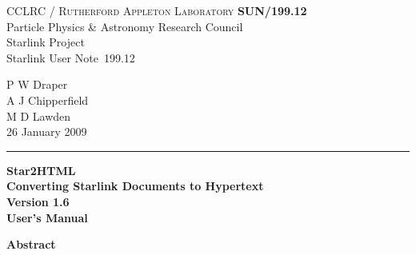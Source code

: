 \documentclass[twoside,11pt]{article}
\newcommand{\stardoccategory}  {Starlink User Note}
\newcommand{\stardocinitials}  {SUN}
\newcommand{\stardocnumber}    {199.12}
\newcommand{\stardocauthors}   {P W Draper\\
                                A J Chipperfield\\
                                M D Lawden}
\newcommand{\stardocdate}      {26 January 2009}
\newcommand{\stardoctitle}     {Star2HTML\\[1ex]
                                Converting Starlink Documents to Hypertext}
\newcommand{\stardocversion}   {Version 1.6}
\newcommand{\stardocmanual}    {User's Manual}
\newcommand{\stardocname}{\stardocinitials /\stardocnumber}
\newenvironment{latexonly}{}{}
\renewcommand{\_}{\texttt{\symbol{95}}}
\begin{document}
\thispagestyle{empty}

\begin{latexonly}
   CCLRC / \textsc{Rutherford Appleton Laboratory} \hfill \textbf{\stardocname}\\
   {\large Particle Physics \& Astronomy Research Council}\\
   {\large Starlink Project\\}
   {\large \stardoccategory\ \stardocnumber}
   \begin{flushright}
   \stardocauthors\\
   \stardocdate
   \end{flushright}
   \vspace{-4mm}
   \rule{\textwidth}{0.5mm}
   \vspace{5mm}
   \begin{center}
   {\Huge\textbf{\stardoctitle \\ [2.5ex]}}
   {\LARGE\textbf{\stardocversion \\ [4ex]}}
   {\Huge\textbf{\stardocmanual}}
   \end{center}
   \vspace{5mm}


   \vspace{10mm}
   \begin{center}
      {\Large\textbf{Abstract}}
   \end{center}
\end{latexonly}
\end{document}
